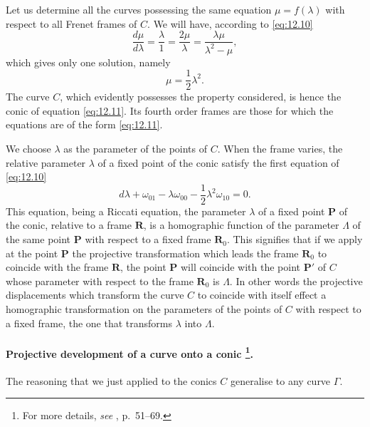 \documentclass[leqno,11pt]{book}
\numberwithin{equation}{chapter}
\theoremstyle{shape1}
\theoremstyle{shapesmall}
\begin{document}
Let us determine all the curves possessing the same equation $\mu=f(\lambda)$ with respect to all Frenet frames of $C$. We will have, according to \eqref{eq:12.10}
\[
\frac{d\mu}{d\lambda}=\frac{\lambda}{1}=\frac{2\mu}{\lambda}=\frac{\lambda\mu}{\lambda^{2}-\mu},
\]
which gives only one solution, namely
\begin{equation}
  \label{eq:12.11}
  \mu=\frac{1}{2}\lambda^{2}.
\end{equation}
The curve $C$, which evidently possesses the property considered, is hence the conic of equation \eqref{eq:12.11}. Its fourth order frames are those for which the equations are of the form \eqref{eq:12.11}.

We choose $\lambda$ as the parameter of the points of $C$. When the frame varies, the relative parameter $\lambda$ of a fixed point of the conic satisfy the first equation of \eqref{eq:12.10}
\begin{equation}
  \label{eq:12.12}
  d\lambda+\omega_{01}-\lambda\omega_{00}-\frac{1}{2}\lambda^{2}\omega_{10}=0.
\end{equation}
This equation, being a Riccati equation, the parameter $\lambda$ of a fixed point $\mathbf{P}$ of the conic, relative to a frame $\mathbf{R}$, is a homographic function of the parameter $\Lambda$ of the same point $\mathbf{P}$ with respect to a fixed frame $\mathbf{R}_{0}$. This signifies that if we apply at the point $\mathbf{P}$ the projective transformation which leads the frame $\mathbf{R}_{0}$ to coincide with the frame $\mathbf{R}$, the point $\mathbf{P}$ will coincide with the point $\mathbf{P}'$ of $C$ whose parameter with respect to the frame $\mathbf{R}_{0}$ is $\Lambda$. In other words the projective displacements which transform the curve $C$ to coincide with itself effect a homographic transformation on the parameters of the points of $C$ with respect to a fixed frame, the one that transforms $\lambda$ into $\Lambda$.


\paragraph[{Projective development of a curve onto a conic.}]{Projective development of a curve onto a conic \footnote{For more details, \emph{see} \cite{20}, p.~51--69.}.}
\label{sec:183}
The reasoning that we just applied to the conics $C$ generalise to any curve $\Gamma$.
\end{document}
